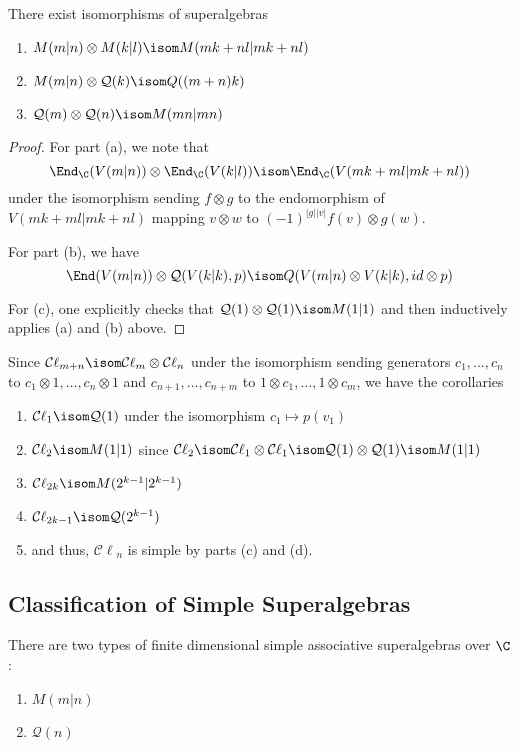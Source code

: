 \documentclass[11pt,leqno,oneside]{amsbook}
\renewcommand{\Q}{\mathcal{Q}}
\newcommand{\Cl}{\mathcal{C\ell}}
\numberwithin{thm}{section}
\begin{document}
\begin{lem}
  There exist isomorphisms of superalgebras
  \begin{enumerate}
  \item \(M(m|n) \otimes M(k|l) \isom M(mk+nl|mk+nl)\)
  \item \(M(m|n) \otimes \Q(k) \isom Q((m+n)k)\)
  \item \(\Q(m) \otimes \Q(n) \isom M(mn|mn)\)
  \end{enumerate}
\end{lem}
\begin{proof}
  For part (a), we note that \[
    \End_\C(V(m|n)) \otimes \End_\C(V(k|l)) \isom \End_\C(V(mk+ml | mk+nl))
  \]
  under the isomorphism sending \(f \otimes g\) to the endomorphism of
  \(V(mk+ml | mk+nl)\) mapping \(v \otimes w\) to \((-1)^{|g||v|}f(v)
  \otimes g(w)\).

  For part (b), we have \[
    \End(V(m|n)) \otimes \Q(V(k|k),p) \isom Q(V(m|n) \otimes V(k|k), id
    \otimes p)
  \]

  For (c), one explicitly checks that \(\Q(1) \otimes \Q(1) \isom
  M(1|1)\) and then inductively applies (a) and (b) above.
\end{proof}
\begin{cor}
   Since \(\Cl_{m+n} \isom \Cl_m \otimes \Cl_n\) under the isomorphism
    sending generators \(c_1, \ldots, c_n\) to \(c_1 \otimes 1,
    \ldots, c_n \otimes 1\) and \(c_{n+1}, \ldots, c_{n+m}\) to \(1
    \otimes c_1, \ldots, 1 \otimes c_m\), we have the corollaries
  \begin{enumerate}
  \item \(\Cl_1 \isom \Q(1)\) under the isomorphism \(c_1 \mapsto
    p(v_1)\)
  \item \(\Cl_2 \isom M(1|1)\) since \(\Cl_2 \isom \Cl_1 \otimes \Cl_1
    \isom \Q(1) \otimes \Q(1) 
    \isom M(1|1)\)
  \item \(\Cl_{2k} \isom M(2^{k-1}|2^{k-1})\)
  \item \(\Cl_{2k-1} \isom \Q(2^{k-1})\)
  \item and thus, \(\Cl_n\) is simple by parts (c) and (d).
  \end{enumerate}
\end{cor}
\subsection{Classification of Simple Superalgebras}
\begin{thm}
  There are two types of finite dimensional simple associative
  superalgebras over \(\C\):
  \begin{enumerate}
  \item \(M(m|n)\)
  \item \(\Q(n)\)
  \end{enumerate}
\end{thm} 
\end{document}
